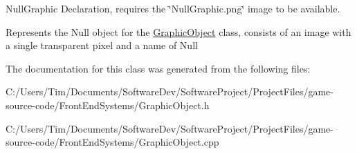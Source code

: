 Null\+Graphic Declaration, requires the \char`\"{}\+Null\+Graphic.\+png\char`\"{} image to be available. 

Represents the Null object for the \hyperlink{class_graphic_object}{Graphic\+Object} class, consists of an image with a single transparent pixel and a name of Null 

The documentation for this class was generated from the following files\+:\begin{DoxyCompactItemize}
\item 
C\+:/\+Users/\+Tim/\+Documents/\+Software\+Dev/\+Software\+Project/\+Project\+Files/game-\/source-\/code/\+Front\+End\+Systems/Graphic\+Object.\+h\item 
C\+:/\+Users/\+Tim/\+Documents/\+Software\+Dev/\+Software\+Project/\+Project\+Files/game-\/source-\/code/\+Front\+End\+Systems/Graphic\+Object.\+cpp\end{DoxyCompactItemize}
